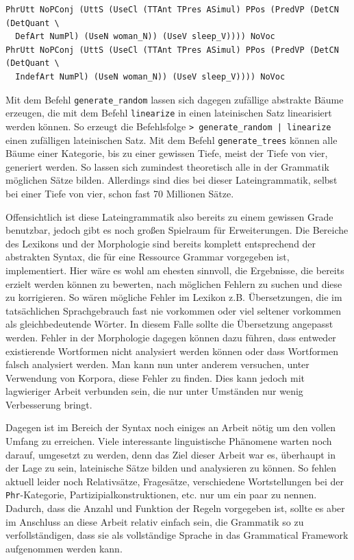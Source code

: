 \begin{lstlisting}[float=h!tp,caption={Abstrakte Syntaxrepräsentationen des Satzes \textit{feminae dormiunt}},label={GF-AbstractStrings},basicstyle=\small]
PhrUtt NoPConj (UttS (UseCl (TTAnt TPres ASimul) PPos (PredVP (DetCN (DetQuant \
  DefArt NumPl) (UseN woman_N)) (UseV sleep_V)))) NoVoc 
PhrUtt NoPConj (UttS (UseCl (TTAnt TPres ASimul) PPos (PredVP (DetCN (DetQuant \
  IndefArt NumPl) (UseN woman_N)) (UseV sleep_V)))) NoVoc
\end{lstlisting}
Mit dem Befehl \texttt{generate\_random} lassen sich dagegen zufällige abstrakte Bäume erzeugen, die mit dem Befehl \texttt{linearize} in einen lateinischen Satz linearisiert werden können. So erzeugt die Befehlsfolge \texttt{> generate\_random | linearize } einen zufälligen lateinischen Satz. Mit dem Befehl \texttt{generate\_trees} können alle Bäume einer Kategorie, bis zu einer gewissen Tiefe, meist der Tiefe von vier, generiert werden. So lassen sich zumindest theoretisch alle in der Grammatik möglichen Sätze bilden. Allerdings sind dies bei dieser Lateingrammatik, selbst bei einer Tiefe von vier, schon fast 70 Millionen Sätze. \par
Offensichtlich ist diese Lateingrammatik also bereits zu einem gewissen Grade benutzbar, jedoch gibt es noch großen Spielraum für Erweiterungen. Die Bereiche des Lexikons und der Morphologie sind bereits komplett entsprechend der abstrakten Syntax, die für eine Ressource Grammar vorgegeben ist, implementiert. Hier wäre es wohl am ehesten sinnvoll, die Ergebnisse, die bereits erzielt werden können zu bewerten, nach möglichen Fehlern zu suchen und diese zu korrigieren. So wären mögliche Fehler im Lexikon z.B. Übersetzungen, die im tatsächlichen Sprachgebrauch fast nie vorkommen oder viel seltener vorkommen als gleichbedeutende Wörter. In diesem Falle sollte die Übersetzung angepasst werden. Fehler in der Morphologie dagegen können dazu führen, dass entweder existierende Wortformen nicht analysiert werden können oder dass Wortformen falsch analysiert werden. Man kann nun unter anderem versuchen, unter Verwendung von Korpora, diese Fehler zu finden. Dies kann jedoch mit lagwieriger Arbeit verbunden sein, die nur unter Umständen nur wenig Verbesserung bringt. \par
Dagegen ist im Bereich der Syntax noch einiges an Arbeit nötig um den vollen Umfang zu erreichen. Viele interessante linguistische Phänomene warten noch darauf, umgesetzt zu werden, denn das Ziel dieser Arbeit war es, überhaupt in der Lage zu sein, lateinische Sätze bilden und analysieren zu können. So fehlen aktuell leider noch Relativsätze, Fragesätze, verschiedene Wortstellungen bei der \texttt{Phr}-Kategorie, Partizipialkonstruktionen, etc. nur um ein paar zu nennen. Dadurch, dass die Anzahl und Funktion der Regeln vorgegeben ist, sollte es aber im Anschluss an diese Arbeit relativ einfach sein, die Grammatik so zu verfollständigen, dass sie als vollständige Sprache in das Grammatical Framework aufgenommen werden kann. 
